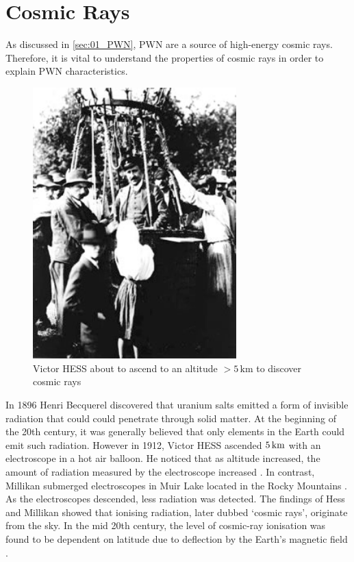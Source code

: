\section{Cosmic Rays} \label{sec:01_cosmic_rays}

As discussed in \autoref{sec:01_PWN}, PWN are a source of high-energy cosmic rays. Therefore, it is vital to understand the properties of cosmic rays in order to explain PWN characteristics.
\begin{figure}[ht]
	\centering
	\includegraphics[width=0.7\textwidth]{04_Introduction/Images/History/hess_balloon_flight.jpg}
	\caption{Victor HESS about to ascend to an altitude $>5\,\si{\kilo\meter}$ to discover cosmic rays \citep{hess1912observations}}
	\label{fig:chapter1_hess_balloon_flight}
\end{figure}
\newpar 
In 1896 Henri Becquerel discovered that uranium salts emitted a form of invisible radiation that could could penetrate through solid matter. At the beginning of the 20th century, it was generally believed that only elements in the Earth could emit such radiation. However in 1912, Victor HESS ascended $5\,\si{\kilo\meter}$ with an electroscope in a hot air balloon. He noticed that as altitude increased, the amount of radiation measured by the electroscope increased \citep{hess1912observations}. In contrast, Millikan submerged electroscopes in Muir Lake located in the Rocky Mountains \citep{1926PhRv...28..851M}.  As the electroscopes descended, less radiation was detected. The findings of Hess and Millikan showed that ionising radiation, later dubbed `cosmic rays', originate from the sky. In the mid 20th century, the level of cosmic-ray ionisation was found to be dependent on latitude due to deflection by the Earth's magnetic field \citep{1960Natur.187.1099S}.
